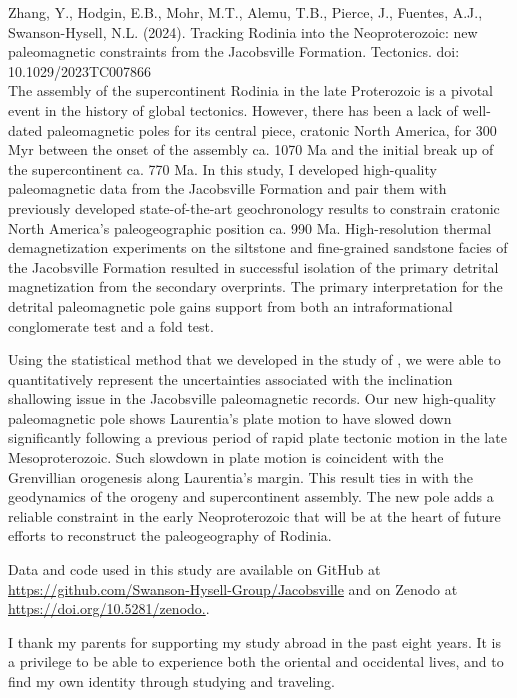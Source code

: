 \documentclass{ucbthesis}
\begin{document}
\begin{frontmatter}
Zhang, Y., Hodgin, E.B., Mohr, M.T., Alemu, T.B., Pierce, J., Fuentes, A.J., Swanson-Hysell, N.L. (2024). Tracking Rodinia into the Neoproterozoic: new paleomagnetic constraints from the Jacobsville Formation. Tectonics. doi: 10.1029/2023TC007866
\\

The assembly of the supercontinent Rodinia in the late Proterozoic is a pivotal event in the history of global tectonics. However, there has been a lack of well-dated paleomagnetic poles for its central piece, cratonic North America, for 300 Myr between the onset of the assembly ca. 1070 Ma and the initial break up of the supercontinent ca. 770 Ma. In this study, I developed high-quality paleomagnetic data from the Jacobsville Formation and pair them with previously developed state-of-the-art geochronology results to constrain cratonic North America's paleogeographic position ca. 990 Ma. High-resolution thermal demagnetization experiments on the siltstone and fine-grained sandstone facies of the Jacobsville Formation resulted in successful isolation of the primary detrital magnetization from the secondary overprints. The primary interpretation for the detrital paleomagnetic pole gains support from both an intraformational conglomerate test and a fold test. 
 
Using the statistical method that we developed in the study of \cite{Pierce2022a}, we were able to quantitatively represent the uncertainties associated with the inclination shallowing issue in the Jacobsville paleomagnetic records. Our new high-quality paleomagnetic pole shows Laurentia's plate motion to have slowed down significantly following a previous period of rapid plate tectonic motion in the late Mesoproterozoic. Such slowdown in plate motion is coincident with the Grenvillian orogenesis along Laurentia's margin. This result ties in with the geodynamics of the orogeny and supercontinent assembly. The new pole adds a reliable constraint in the early Neoproterozoic that will be at the heart of future efforts to reconstruct the paleogeography of Rodinia.

Data and code used in this study are available on GitHub at \url{https://github.com/Swanson-Hysell-Group/Jacobsville} and on Zenodo at \url{https://doi.org/10.5281/zenodo.}.

\begin{acknowledgements}

I thank my parents for supporting my study abroad in the past eight years. It is a privilege to be able to experience both the oriental and occidental lives, and to find my own identity through studying and traveling.


\end{acknowledgements}
\end{frontmatter}
\end{document}

